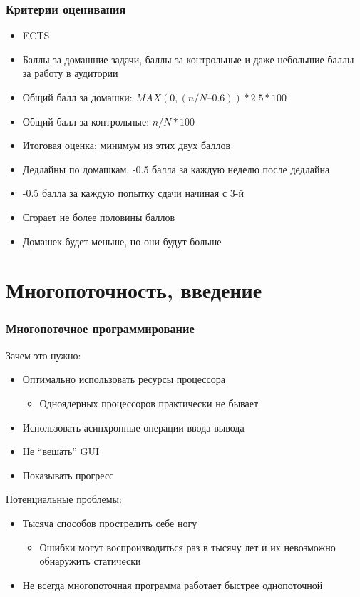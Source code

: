 \documentclass{../../slides-style}
\begin{document}
    \begin{frame}
        \frametitle{Критерии оценивания}
        \begin{itemize}
            \item ECTS
            \item Баллы за домашние задачи, баллы за контрольные и даже небольшие баллы за работу в аудитории
            \item Общий балл за домашки: $MAX(0, (n/N – 0.6)) * 2.5 * 100$
            \item Общий балл за контрольные: $n/N * 100$
            \item Итоговая оценка: минимум из этих двух баллов
            \item Дедлайны по домашкам, -0.5 балла за каждую неделю после дедлайна
            \item -0.5 балла за каждую попытку сдачи начиная с 3-й
            \item Сгорает не более половины баллов
            \item Домашек будет меньше, но они будут больше
        \end{itemize}
    \end{frame}

    \section{Многопоточность, введение}

    \begin{frame}
        \frametitle{Многопоточное программирование}
        Зачем это нужно:
        \begin{itemize}
            \item Оптимально использовать ресурсы процессора
            \begin{itemize}
                \item Одноядерных процессоров практически не бывает
            \end{itemize}
            \item Использовать асинхронные операции ввода-вывода
            \item Не ``вешать'' GUI
            \item Показывать прогресс
        \end{itemize}
        \vspace{5mm}
        Потенциальные проблемы:
        \begin{itemize}
            \item Тысяча способов прострелить себе ногу
            \begin{itemize}
                \item Ошибки могут воспроизводиться раз в тысячу лет и их невозможно обнаружить статически
            \end{itemize}
            \item Не всегда многопоточная программа работает быстрее однопоточной
        \end{itemize}
    \end{frame}
\end{document}
